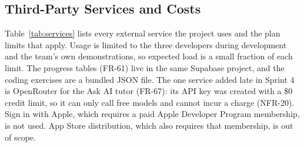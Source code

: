 \documentclass[12pt,letterpaper]{article}
\begin{document}
\subsection{Third-Party Services and Costs}
Table~\ref{tab:services} lists every external service the project uses and the plan
limits that apply. Usage is limited to the three developers during development and
the team's own demonstrations, so expected load is a small fraction of each limit.
The progress tables (FR-61) live in the same Supabase project, and the coding
exercises are a bundled JSON file. The one service added late in Sprint 4 is
OpenRouter for the Ask AI tutor (FR-67): its API key was created with a \$0 credit
limit, so it can only call free models and cannot incur a charge (NFR-20).
Sign in with Apple, which requires a paid Apple Developer Program membership, is not
used. App Store distribution, which also requires that membership, is out of scope.
\end{document}
